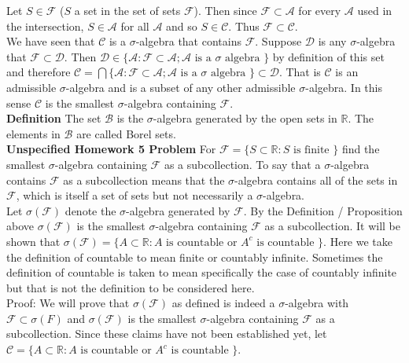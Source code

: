 \documentclass[a4paper]{article}
\begin{document}
Let $S \in \mathcal{F}$ ($S$ a set in the set of sets $\mathcal{F}$). Then since $\mathcal{F}\subset \mathcal{A}$ for every $\mathcal{A}$ used in the intersection, $S \in \mathcal{A}$ for all $\mathcal{A}$ and so $S \in \mathcal{C}$. Thus $\mathcal{F}\subset \mathcal{C}$. \\

We have seen that $\mathcal{C}$ is a $\sigma$-algebra that contains $\mathcal{F}$. Suppose $\mathcal{D}$ is any $\sigma$-algebra that $\mathcal{F}\subset \mathcal{D}$. Then $\mathcal{D} \in \{\mathcal{A} : \mathcal{F}\subset \mathcal{A}; \mathcal{A} \text{ is a } \sigma \text{ algebra }\}$ by definition of this set and therefore $\mathcal{C} = \bigcap \{\mathcal{A} : \mathcal{F}\subset \mathcal{A}; \mathcal{A} \text{ is a } \sigma \text{ algebra }\} \subset \mathcal{D}$. That is $\mathcal{C}$ is an admissible $\sigma$-algebra and is a subset of any other admissible $\sigma$-algebra. In this sense $\mathcal{C}$ is the smallest $\sigma$-algebra containing $\mathcal{F}$.\\

{\bf Definition} The set $\mathcal{B}$ is the $\sigma$-algebra generated by the open sets in $\mathbb{R}$. The elements in $\mathcal{B}$ are called Borel sets. \\


{\bf Unspecified Homework 5 Problem} For $\mathcal{F} = \{S \subset \mathbb{R} : S \text{ is finite }\}$ find the smallest $\sigma$-algebra containing $\mathcal{F}$ as a subcollection. To say that a $\sigma$-algebra contains $\mathcal{F}$ as a subcollection means that the $\sigma$-algebra contains all of the sets in $\mathcal{F}$, which is itself a set of sets but not necessarily a $\sigma$-algebra. \\

Let $\sigma(\mathcal{F})$ denote the $\sigma$-algebra generated by $\mathcal{F}$. By the Definition / Proposition above $\sigma(\mathcal{F})$ is the smallest $\sigma$-algebra containing $\mathcal{F}$ as a subcollection. It will be shown that $\sigma(\mathcal{F}) = \{A \subset \mathbb{R} : A \text{ is countable or } A^c \text{ is countable }\}$. Here we take the definition of countable to mean finite or countably infinite. Sometimes the definition of countable is taken to mean specifically the case of countably infinite but that is not the definition to be considered here.\\

Proof: We will prove that $\sigma(\mathcal{F})$ as defined is indeed a $\sigma$-algebra with $\mathcal{F} \subset\sigma(F)$ and $\sigma(\mathcal{F})$ is the smallest $\sigma$-algebra containing $\mathcal{F}$ as a subcollection. Since these claims have not been established yet, let $\mathcal{C} = \{A \subset \mathbb{R} : A \text{ is countable or } A^c \text{ is countable }\}$.\\
\end{document}
